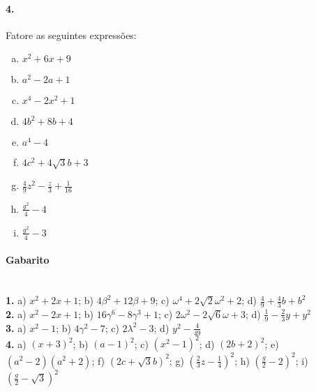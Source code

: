 \documentclass[a4paper,12pt]{article}
\begin{document}
\begin{multicols}{2}
\paragraph{4.} Fatore as seguintes expressões:
\begin{enumerate}[a)]
\item $x^2 + 6x + 9$
\item $a^2 - 2a + 1$
\item $x^4 - 2x^2 + 1$
\item $4b^2 + 8b + 4$ 
\item $a^4 - 4$
\item $4c^2 + 4\sqrt{3}b + 3$
\item $\displaystyle \frac{4}{9}z^2 - \frac{z}{3} + \frac{1}{16}$
\item $\displaystyle \frac{g^2}{4} - 4$ 
\item $\displaystyle \frac{g^2}{4} - 3$ 
\end{enumerate}
\vspace*{3cm}
\end{multicols}
 
\vspace*{\fill}
{\footnotesize
\paragraph*{Gabarito} \hspace*{\fill}\\
\textbf{1.} a) $x^2 + 2x + 1$; b) $4\beta^2 + 12\beta + 9$; c) $\omega^4 + 2\sqrt{2}\omega^2 + 2$; d) $\frac{4}{9} + \frac{4}{3}b + b^2$\\
\textbf{2.} a) $x^2 - 2x + 1$; b) $16\gamma^6 - 8\gamma^3 + 1$; c) $2\omega^2 - 2\sqrt{6}\omega + 3$; d) $\frac{1}{9} - \frac{2}{3}y + y^2$\\
\textbf{3.} a) $x^2 - 1$; b) $4\gamma^2 - 7$; c) $2\lambda^2 - 3$; d) $y^2 - \frac{4}{49}$\\
\textbf{4.} a) $(x + 3)^2$; b) $(a-1)^2 $; c) $(x^2 - 1)^2$; d) $(2b + 2)^2$; e) $(a^2 - 2)(a^2 + 2)$; f) $(2c + \sqrt{3}b)^2$; g) $\left(\frac{2}{3}z - \frac{1}{4}\right)^2$; h) $\left(\frac{g}{2} - 2\right)^2$; i) $\left(\frac{g}{2} - \sqrt{3}\right)^2$
}
\end{document}
